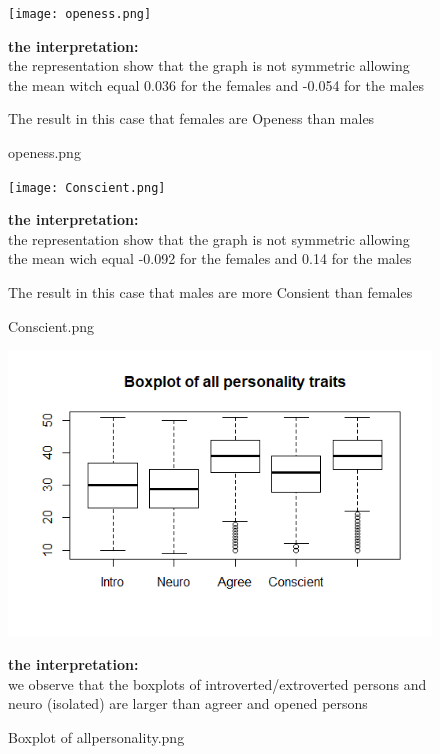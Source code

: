 \begin{figure}[]
\setlength{\abovecaptionskip}{-4pt}
\begin{center}
  \texttt{[image: openess.png]} 
  \caption{openess.png}
\end{center}

{\normalsize{\bf the interpretation:}} \\\vspace{0.5cm}
the representation show that the graph is not symmetric allowing 
the mean witch equal 0.036 for the females and -0.054 for the males

The result in this case that females are Openess than males
\end{figure}

\begin{figure}[]
\setlength{\abovecaptionskip}{-4pt}
\begin{center}
\texttt{[image: Conscient.png]}
  \caption{Conscient.png}
  \end{center}


{\normalsize{\bf the interpretation:}} \\\vspace{0.5cm}
the representation show that the graph is not symmetric allowing 
the mean wich equal -0.092 for the females and 0.14 for the males

The result in this case that males are  more Consient  than females

\end{figure}
\begin{figure}[]
\setlength{\abovecaptionskip}{-4pt}
\begin{center}
\includegraphics{Boxplot_of_all_personality.png}
  \caption{Boxplot of allpersonality.png}
  \end{center}


{\normalsize{\bf the interpretation:}} \\\vspace{0.5cm}
we observe that the boxplots of introverted/extroverted persons and neuro (isolated) are larger than agreer and opened persons 

\end{figure}






